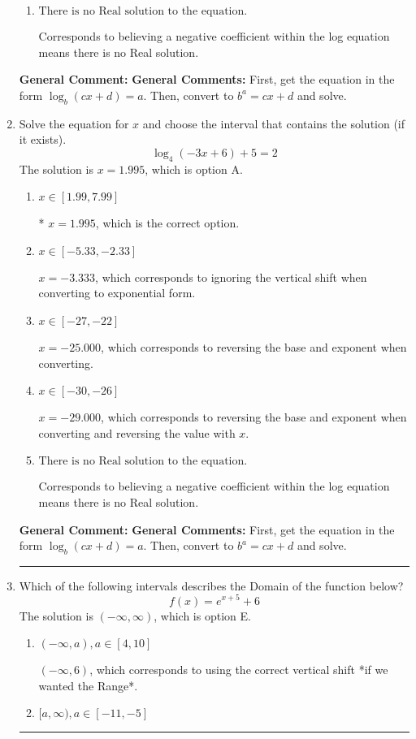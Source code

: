 \documentclass{extbook}[14pt]
\newcommand{\litem}[1]{\item #1

\rule{\textwidth}{0.4pt}}
\begin{document}
\begin{enumerate}
{\begin{enumerate}[label=\Alph*.]
$x = -2.000$, which corresponds to reversing the base and exponent when converting.
\item \( \text{There is no Real solution to the equation.} \)

Corresponds to believing a negative coefficient within the log equation means there is no Real solution.
\end{enumerate}

\textbf{General Comment:} \textbf{General Comments:} First, get the equation in the form $\log_b{(cx+d)} = a$. Then, convert to $b^a = cx+d$ and solve.
}
\litem{
Solve the equation for $x$ and choose the interval that contains the solution (if it exists).
\[ \log_{4}{(-3x+6)}+5 = 2 \]The solution is \( x = 1.995 \), which is option A.\begin{enumerate}[label=\Alph*.]
\item \( x \in [1.99, 7.99] \)

* $x = 1.995$, which is the correct option.
\item \( x \in [-5.33, -2.33] \)

$x = -3.333$, which corresponds to ignoring the vertical shift when converting to exponential form.
\item \( x \in [-27, -22] \)

$x = -25.000$, which corresponds to reversing the base and exponent when converting.
\item \( x \in [-30, -26] \)

$x = -29.000$, which corresponds to reversing the base and exponent when converting and reversing the value with $x$.
\item \( \text{There is no Real solution to the equation.} \)

Corresponds to believing a negative coefficient within the log equation means there is no Real solution.
\end{enumerate}

\textbf{General Comment:} \textbf{General Comments:} First, get the equation in the form $\log_b{(cx+d)} = a$. Then, convert to $b^a = cx+d$ and solve.
}
\litem{
Which of the following intervals describes the Domain of the function below?
\[ f(x) = e^{x+5}+6 \]The solution is \( (-\infty, \infty) \), which is option E.\begin{enumerate}[label=\Alph*.]
\item \( (-\infty, a), a \in [4, 10] \)

$(-\infty, 6)$, which corresponds to using the correct vertical shift *if we wanted the Range*.
\item \( [a, \infty), a \in [-11, -5] \)


\end{enumerate}}
\end{enumerate}
\end{document}
